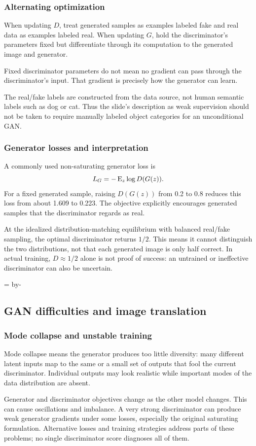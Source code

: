 \documentclass[11pt]{article}
\newcommand{\newsubsection}[1]{\par\begingroup\skip0=\pagegoal\advance\skip0 by-\pagetotal\ifdim\skip0<12\baselineskip\newpage\fi\endgroup\subsection{#1}}
\begin{document}
\subsubsection{Alternating optimization}
When updating $D$, treat generated samples as examples labeled fake and real data as examples labeled real. When updating $G$, hold the discriminator's parameters fixed but differentiate through its computation to the generated image and generator.

Fixed discriminator parameters do not mean no gradient can pass through the discriminator's input. That gradient is precisely how the generator can learn.

The real/fake labels are constructed from the data source, not human semantic labels such as dog or cat. Thus the slide's description as weak supervision should not be taken to require manually labeled object categories for an unconditional GAN.

\subsubsection{Generator losses and interpretation}
A commonly used non-saturating generator loss is
\[
L_G=-\operatorname{E}_z\log D(G(z)).
\]
For a fixed generated sample, raising $D(G(z))$ from 0.2 to 0.8 reduces this loss from about 1.609 to 0.223. The objective explicitly encourages generated samples that the discriminator regards as real.

At the idealized distribution-matching equilibrium with balanced real/fake sampling, the optimal discriminator returns $1/2$. This means it cannot distinguish the two distributions, not that each generated image is only half correct. In actual training, $D\approx1/2$ alone is not proof of success: an untrained or ineffective discriminator can also be uncertain.

\newsubsection{GAN difficulties and image translation}
\subsubsection{Mode collapse and unstable training}
Mode collapse means the generator produces too little diversity: many different latent inputs map to the same or a small set of outputs that fool the current discriminator. Individual outputs may look realistic while important modes of the data distribution are absent.

Generator and discriminator objectives change as the other model changes. This can cause oscillations and imbalance. A very strong discriminator can produce weak generator gradients under some losses, especially the original saturating formulation. Alternative losses and training strategies address parts of these problems; no single discriminator score diagnoses all of them.
\end{document}
